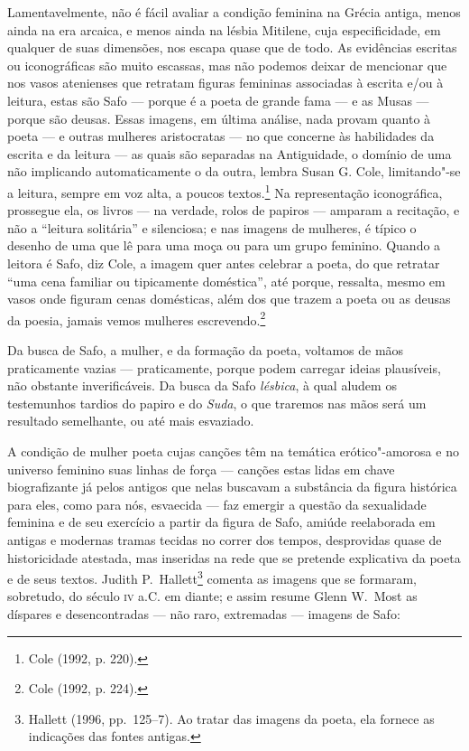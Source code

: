 Lamentavelmente, não é fácil avaliar a condição feminina na Grécia
antiga, menos ainda na era arcaica, e menos ainda na lésbia Mitilene, cuja
especificidade, em qualquer de suas dimensões, nos escapa quase que
de todo. As evidências escritas ou iconográficas são muito
escassas, mas não podemos deixar de mencionar que nos vasos atenienses que
retratam figuras femininas associadas à escrita e/ou à leitura, estas são Safo
--- porque é a poeta de grande fama --- e as Musas --- porque são deusas.
Essas imagens, em última análise, nada provam quanto à poeta --- e outras mulheres
aristocratas --- no que concerne às habilidades da escrita e da leitura --- as
quais são separadas na Antiguidade, o domínio de uma não implicando
automaticamente o da outra, lembra Susan G. Cole, limitando"-se a
leitura, sempre em voz alta, a poucos textos.\footnote{ Cole (1992, p. 220).} Na representação iconográfica,
prossegue ela, os livros --- na verdade, rolos de papiros --- amparam a
recitação, e não a “leitura solitária” e silenciosa; e nas imagens de mulheres,
é típico o desenho de uma que lê para uma moça ou para um grupo feminino.
Quando a leitora é Safo, diz Cole, a imagem quer antes celebrar a poeta, do que
retratar “uma cena familiar ou tipicamente doméstica”, até porque, ressalta,
mesmo em vasos onde figuram cenas domésticas, além dos que trazem a poeta ou as
deusas da poesia, jamais vemos mulheres escrevendo.\footnote{ Cole (1992, p. 224).}

Da busca de Safo, a mulher, e da formação da poeta, voltamos de mãos
praticamente vazias --- praticamente, porque podem carregar ideias plausíveis,
não obstante inverificáveis. Da busca da Safo \textit{lésbica}, à qual
aludem os testemunhos tardios do papiro e do \textit{Suda}, o que traremos nas
mãos será um resultado semelhante, ou até mais esvaziado.

A condição de mulher poeta cujas canções têm na temática erótico"-amorosa e no
universo feminino suas linhas de força --- canções estas lidas em chave
biografizante já pelos antigos que nelas buscavam a substância da figura
histórica para eles, como para nós, esvaecida --- faz emergir a questão da
sexualidade feminina e de seu exercício a partir da figura de Safo,
amiúde reelaborada em antigas e modernas tramas tecidas no correr dos
tempos, desprovidas quase de historicidade atestada, mas
inseridas na rede que se pretende explicativa da poeta e de seus textos. Judith
P.~Hallett\footnote{ Hallett (1996, pp.~125--7). Ao tratar das
imagens da poeta, ela fornece as indicações das fontes antigas.} comenta as
imagens que se formaram, sobretudo, do século \textsc{iv} a.C. em diante; e assim resume
Glenn W.~Most as díspares e desencontradas --- não raro,
extremadas --- imagens de Safo: 

